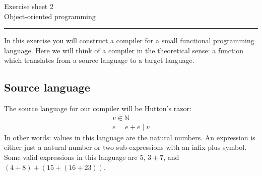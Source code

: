 \documentclass[10pt,a4paper,fleqn]{exam}
\begin{document}
\begin{center}
\Large Exercise sheet 2 \\
\LARGE Object-oriented programming 
\end{center}

\hrule

\vspace{0.5cm}

In this exercise you will construct a compiler for a small functional programming language. Here we will think of a compiler in the theoretical sense: a function which translates from a source language to a target language. 

\begin{questions}

\section{Source language}

\question The source language for our compiler will be Hutton's razor:
\begin{displaymath}
\begin{array}{l}
v \in \mathbb{N} \\
e = e + e \mid v
\end{array}
\end{displaymath}
In other words: values in this language are the natural numbers. An expression is either just a natural number or two sub-expressions with an infix plus symbol. Some valid expressions in this language are $5$, $3 + 7$, and $(4 + 8) + (15 + (16 + 23))$.
\end{questions}
\end{document}
